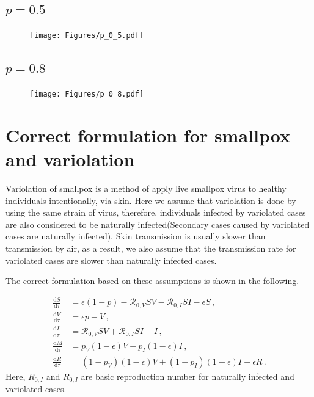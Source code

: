 \documentclass[12pt]{article}
\newcommand\dbyd[2]{\frac{\mathrm d{#1}}{\mathrm d{#2}}}
\newcommand{\R}{\mathcal{R}}
\newcommand{\pmV}{p_{V}}
\newcommand{\pmI}{p_{I}}
\begin{document}
\subsection{$p=0.5$}
\begin{figure}[H]
  \caption{}
  \centering
  \texttt{[image: Figures/p\_0\_5.pdf]}
\end{figure}

\subsection{$p=0.8$}
\begin{figure}[H]
  \caption{}
  \centering
  \texttt{[image: Figures/p\_0\_8.pdf]}
\end{figure}
\clearpage
\section{Correct formulation for smallpox and variolation}

Variolation of smallpox is a method of apply live smallpox virus to healthy individuals intentionally, via skin. Here we assume that variolation is done by using the same strain of virus, therefore, individuals infected by variolated cases are also considered to be naturally infected(Secondary cases caused by variolated cases are naturally infected). Skin transmission is usually slower than transmission by air, as a result, we also assume that the transmission rate for variolated cases are slower than naturally infected cases.

The correct formulation based on these assumptions is shown in the following.

\begin{subequations}\label{eq:base_ODE}
\begin{align}
\dbyd{S}{\tau}&=\epsilon(1-p)-\R_{0,V} SV-\R_{0,I} SI-\epsilon S\,, \label{eq:S_by_tau}\\
\dbyd{V}{\tau}&=\epsilon p-V\,, \label{eq:V_by_tau}\\
\dbyd{I}{\tau}&=\R_{0,V} SV+\R_{0,I} SI-I\,, \label{eq:I_by_tau}\\
\dbyd{M}{\tau}&=\pmV(1-\epsilon) V+\pmI(1-\epsilon) I\,,\\
\dbyd{R}{\tau}&=(1-\pmV)(1-\epsilon) V+(1-\pmI)(1-\epsilon) I-\epsilon R\,.
\end{align}
\end{subequations}
Here, $R_{0,I}$ and $R_{0,I}$ are basic reproduction number for naturally infected and variolated cases.
\end{document}
